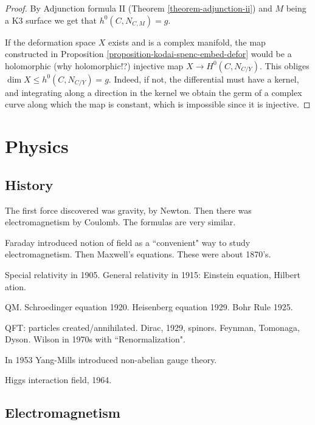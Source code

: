 \documentclass{book}
\begin{document}
{\begin{proof}
By Adjunction formula II
(Theorem \ref{theorem-adjunction-ii})
and $M$ being a K3 surface
we get that $h^0(C,N_{C,M})=g$.

If the deformation space $X$ exists and is a
complex manifold,
the map constructed in
Proposition
\ref{proposition-kodai-spenc-embed-defor}
would be a holomorphic (why holomorphic!?)
injective map $X \to H^0(C,N_{C/Y})$.
This obliges $\dim X \leq  h^0(C,N_{C/Y})=g$.
Indeed, if not, the differential must have a
kernel,
and integrating along a direction in the
kernel
we obtain the germ of a complex curve along
which
the map is constant, which is impossible
since it is injective.
\end{proof}








\chapter{Physics}
\label{chapter-physics}





\section{History}
\label{section-history}

The first force discovered was gravity, by
Newton. Then there was
electromagnetism by Coulomb. The formulas are
very similar.

Faraday introduced notion of field as a
``convenient" way to study
electromagnetism. Then Maxwell's equations.
These were about 1870's.

Special relativity in 1905. General
relativity in 1915: Einstein equation,
Hilbert
ation.

QM. Schroedinger equation 1920. Heisenberg
equation 1929. Bohr Rule 1925.

QFT: particles created/annihilated. Dirac,
1929, spinors. Feynman, Tomonaga,
Dyson. Wilson in 1970s with
``Renormalization".

In 1953 Yang-Mills introduced non-abelian
gauge theory.

Higgs interaction field, 1964.

\section{Electromagnetism}
\label{section-electromagnetism}

}
\end{document}
